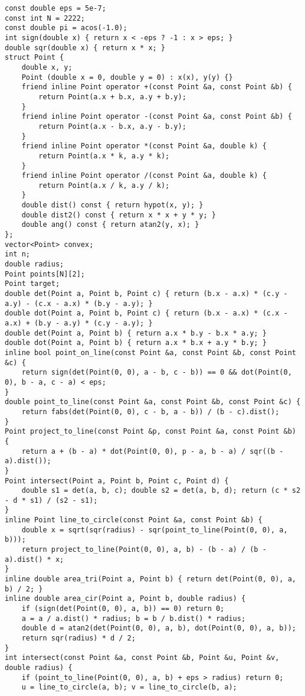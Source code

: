 \begin{lstlisting}
const double eps = 5e-7;
const int N = 2222;
const double pi = acos(-1.0);
int sign(double x) { return x < -eps ? -1 : x > eps; }
double sqr(double x) { return x * x; }
struct Point {
	double x, y;
	Point (double x = 0, double y = 0) : x(x), y(y) {}
	friend inline Point operator +(const Point &a, const Point &b) {
		return Point(a.x + b.x, a.y + b.y);
	}
	friend inline Point operator -(const Point &a, const Point &b) {
		return Point(a.x - b.x, a.y - b.y);
	}
	friend inline Point operator *(const Point &a, double k) {
		return Point(a.x * k, a.y * k);
	}
	friend inline Point operator /(const Point &a, double k) {
		return Point(a.x / k, a.y / k);
	}
	double dist() const { return hypot(x, y); }
	double dist2() const { return x * x + y * y; }
	double ang() const { return atan2(y, x); }
};
vector<Point> convex; 
int n;
double radius;
Point points[N][2];
Point target;
double det(Point a, Point b, Point c) { return (b.x - a.x) * (c.y - a.y) - (c.x - a.x) * (b.y - a.y); }
double dot(Point a, Point b, Point c) { return (b.x - a.x) * (c.x - a.x) + (b.y - a.y) * (c.y - a.y); }
double det(Point a, Point b) { return a.x * b.y - b.x * a.y; }
double dot(Point a, Point b) { return a.x * b.x + a.y * b.y; }
inline bool point_on_line(const Point &a, const Point &b, const Point &c) {
	return sign(det(Point(0, 0), a - b, c - b)) == 0 && dot(Point(0, 0), b - a, c - a) < eps;
}
double point_to_line(const Point &a, const Point &b, const Point &c) {
	return fabs(det(Point(0, 0), c - b, a - b)) / (b - c).dist();
}
Point project_to_line(const Point &p, const Point &a, const Point &b) {
	return a + (b - a) * dot(Point(0, 0), p - a, b - a) / sqr((b - a).dist());
}
Point intersect(Point a, Point b, Point c, Point d) {
	double s1 = det(a, b, c); double s2 = det(a, b, d); return (c * s2 - d * s1) / (s2 - s1);
}
inline Point line_to_circle(const Point &a, const Point &b) {
	double x = sqrt(sqr(radius) - sqr(point_to_line(Point(0, 0), a, b)));
	return project_to_line(Point(0, 0), a, b) - (b - a) / (b - a).dist() * x;
}
inline double area_tri(Point a, Point b) { return det(Point(0, 0), a, b) / 2; }
inline double area_cir(Point a, Point b, double radius) {
	if (sign(det(Point(0, 0), a, b)) == 0) return 0;
	a = a / a.dist() * radius; b = b / b.dist() * radius;
	double d = atan2(det(Point(0, 0), a, b), dot(Point(0, 0), a, b));
	return sqr(radius) * d / 2;
}
int intersect(const Point &a, const Point &b, Point &u, Point &v, double radius) {
	if (point_to_line(Point(0, 0), a, b) + eps > radius) return 0;
	u = line_to_circle(a, b); v = line_to_circle(b, a);

\end{lstlisting}
